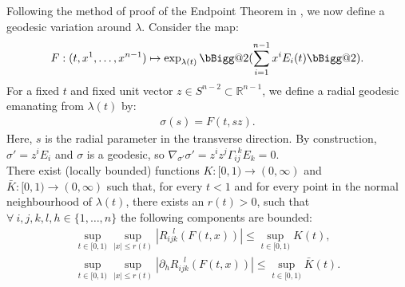 \documentclass[pdflatex,sn-mathphys-num]{sn-jnl}
\makeatletter
\newcommand{\Junbang}[1]{{\color{magenta}#1}}
\newcommand{\vast}{\bBigg@{2}}
\theoremstyle{definition}
\makeatother
\begin{document}
Following the method of proof of the Endpoint Theorem in \cite{Scott_2021}, we now define a geodesic variation around $\lambda$. Consider the map:
\begin{align*}
    F:(t,x^1,\dots,x^{n-1}) \mapsto \exp_{\lambda(t)}\vast(\sum_{i=1}^{n-1}x^iE_i(t)\vast).
\end{align*}
For a fixed $t$ and fixed unit vector $z \in S^{n-2} \subset \mathbb{R}^{n-1}$, we define a radial geodesic emanating from $\lambda(t)$ by:
\begin{align}
    \sigma(s) = F(t,sz).
\end{align}
Here, $s$ is the radial parameter in the transverse direction. By construction, $\sigma' = z^iE_i$ and $\sigma$ is a geodesic, so $\nabla_{\sigma'}\sigma' = z^iz^j\Gamma_{ij}^{~~k}E_k=0$.\\

There exist (locally bounded) functions $K:[0,1) \rightarrow (0,\infty)$ and $\bar{K}:[0,1) \rightarrow (0,\infty)$ such that, for every $t < 1$ and for every point in the normal neighbourhood of $\lambda(t)$, there exists an $r(t)>0$, such that $\forall~ i,j,k,l,h \in \{1,\dots,n\}$ the following components are bounded:
\begin{align}
    \sup_{t \in [0,1)}\sup_{|x| \leq r(t)}|R_{ijk}^{~~~l}(F(t,x))| \leq \sup_{t \in [0,1)}K(t),\\
    \sup_{t \in [0,1)}\sup_{|x| \leq r(t)}|\partial_{h} R_{ijk}^{~~~l}(F(t,x))| \leq \sup_{t \in [0,1)}\bar{K}(t).
\end{align}
\end{document}
